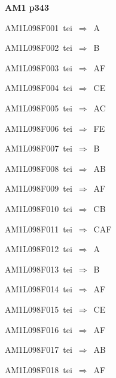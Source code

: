 \par\vfill\eject
{\bf\hfill AM1 p343\hfill\hbox{}}\par\bigskip
{\sixrm AM1L098F001\ {\sixit tei}\ }$\Rightarrow$\ A\par\smallskip
{\sixrm AM1L098F002\ {\sixit tei}\ }$\Rightarrow$\ B\par\smallskip
{\sixrm AM1L098F003\ {\sixit tei}\ }$\Rightarrow$\ AF\par\smallskip
{\sixrm AM1L098F004\ {\sixit tei}\ }$\Rightarrow$\ CE\par\smallskip
{\sixrm AM1L098F005\ {\sixit tei}\ }$\Rightarrow$\ AC\par\smallskip
{\sixrm AM1L098F006\ {\sixit tei}\ }$\Rightarrow$\ FE\par\smallskip
{\sixrm AM1L098F007\ {\sixit tei}\ }$\Rightarrow$\ B\par\smallskip
{\sixrm AM1L098F008\ {\sixit tei}\ }$\Rightarrow$\ AB\par\smallskip
{\sixrm AM1L098F009\ {\sixit tei}\ }$\Rightarrow$\ AF\par\smallskip
{\sixrm AM1L098F010\ {\sixit tei}\ }$\Rightarrow$\ CB\par\smallskip
{\sixrm AM1L098F011\ {\sixit tei}\ }$\Rightarrow$\ CAF\par\smallskip
{\sixrm AM1L098F012\ {\sixit tei}\ }$\Rightarrow$\ A\par\smallskip
{\sixrm AM1L098F013\ {\sixit tei}\ }$\Rightarrow$\ B\par\smallskip
{\sixrm AM1L098F014\ {\sixit tei}\ }$\Rightarrow$\ AF\par\smallskip
{\sixrm AM1L098F015\ {\sixit tei}\ }$\Rightarrow$\ CE\par\smallskip
{\sixrm AM1L098F016\ {\sixit tei}\ }$\Rightarrow$\ AF\par\smallskip
{\sixrm AM1L098F017\ {\sixit tei}\ }$\Rightarrow$\ AB\par\smallskip
{\sixrm AM1L098F018\ {\sixit tei}\ }$\Rightarrow$\ AF\par\smallskip

